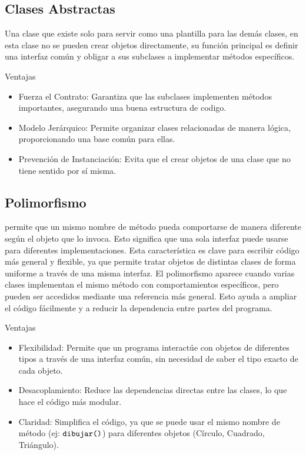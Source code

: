 \documentclass{article}
\begin{document}
\subsection{Clases Abstractas}
Una clase que existe solo para servir como una plantilla para las demás clases, en esta clase no se pueden crear objetos directamente, su función principal es definir una interfaz común y obligar a sus subclases a implementar métodos específicos.

\par\vspace{1.2em} 

\large{{Ventajas}}
\begin{itemize}
    \item {Fuerza el Contrato:} Garantiza que las subclases implementen métodos importantes, asegurando una buena estructura de codigo.
    \item {Modelo Jerárquico:} Permite organizar clases relacionadas de manera lógica, proporcionando una base común para ellas.
    \item {Prevención de Instanciación:} Evita que el crear objetos de una clase que no tiene sentido por sí misma.
\end{itemize}


\subsection{Polimorfismo}
permite que un mismo nombre de método pueda comportarse de manera diferente según el objeto que lo invoca. Esto significa que una sola interfaz puede usarse para diferentes implementaciones. Esta característica es clave para escribir código más general y flexible, ya que permite tratar objetos de distintas clases de forma uniforme a través de una misma interfaz. El polimorfismo aparece cuando varias clases implementan el mismo método con comportamientos específicos, pero pueden ser accedidos mediante una referencia más general. Esto ayuda a ampliar el código fácilmente y a reducir la dependencia entre partes del programa.

\par\vspace{1.2em} 

\large{{Ventajas}}
\begin{itemize}
    \item {Flexibilidad:} Permite que un programa interactúe con objetos de diferentes tipos a través de una interfaz común, sin necesidad de saber el tipo exacto de cada objeto.
    \item {Desacoplamiento:} Reduce las dependencias directas entre las clases, lo que hace el código más modular.
    \item {Claridad:} Simplifica el código, ya que se puede usar el mismo nombre de método (ej: $\verb|dibujar()|$) para diferentes objetos (Círculo, Cuadrado, Triángulo).
\end{itemize}
\end{document}
